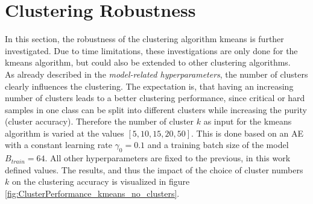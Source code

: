 \documentclass[12pt,DIV14,BCOR12mm,a4paper,footexclude,headinclude,halfparskip-,twoside,openright,cleardoubleempty,idxtotoc,bibtotoc,listtotoc]{scrreprt} %
\numberwithin{equation}{chapter}
\begin{document}
\section{Clustering Robustness}
In this section, the robustness of the clustering algorithm kmeans is further investigated. Due to time limitations, these investigations are only done for the kmeans algorithm, but could also be extended to other clustering algorithms.\\
As already described in the \textit{model-related hyperparameters}, the number of clusters clearly influences the clustering. The expectation is, that having an increasing number of clusters leads to a better clustering performance, since critical or hard samples in one class can be split into different clusters while increasing the purity (cluster accuracy). Therefore the number of cluster $k$ as input for the kmeans algorithm is varied at the values $[5, 10, 15, 20, 50]$. This is done based on an AE with a constant learning rate $\gamma_0=0.1$ and a training batch size of the model $B_{train}=64$. All other hyperparameters are fixed to the previous, in this work defined values. The results, and thus the impact of the choice of cluster numbers $k$ on the clustering accuracy is visualized in figure \ref{fig:ClusterPerformance_kmeans_no_clusters}.
\end{document}
